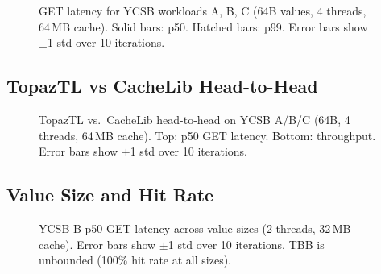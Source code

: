 \documentclass[sigplan,10pt]{acmart}
\begin{document}
\begin{figure}[!ht]
\centering
\resizebox{\columnwidth}{!}{}
\caption{GET latency for YCSB workloads A, B, C (64B values, 4 threads, 64\,MB cache).
  Solid bars: p50. Hatched bars: p99.
  Error bars show $\pm$1 std over 10 iterations.}
\label{fig:ycsb}
\end{figure}

%
%
%

\subsection{TopazTL vs CacheLib Head-to-Head}
\label{sec:eval:headtohead}

\begin{figure}[!ht]
\centering
\resizebox{\columnwidth}{!}{}
\caption{TopazTL vs.\ CacheLib head-to-head on YCSB A/B/C (64B, 4 threads, 64\,MB cache).
  Top: p50 GET latency. Bottom: throughput.
  Error bars show $\pm$1 std over 10 iterations.}
\label{fig:headtohead}
\end{figure}

%
%
%

\subsection{Value Size and Hit Rate}
\label{sec:eval:valuesize}

\begin{figure}[!ht]
\centering
\resizebox{\columnwidth}{!}{}
\caption{YCSB-B p50 GET latency across value sizes (2 threads, 32\,MB cache).
  Error bars show $\pm$1 std over 10 iterations.
  TBB is unbounded (100\% hit rate at all sizes).}
\label{fig:sweep}
\end{figure}
\end{document}
